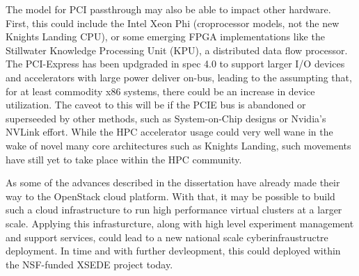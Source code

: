 The model for PCI passthrough may also be able to impact other hardware. First, this could include the Intel Xeon Phi (croprocessor models, not the new Knights Landing CPU), or some emerging FPGA implementations like the Stillwater Knowledge Processing Unit (KPU), a distributed data flow processor.  The PCI-Express has been updgraded in spec 4.0 to support larger I/O devices and accelerators with large power deliver on-bus, leading to the assumpting that, for at least commodity x86 systems, there could be an increase in device utilization. The caveot to this will be if the PCIE bus is abandoned or superseeded by other methods, such as System-on-Chip designs or Nvidia's NVLink effort.  While the HPC accelerator usage could very well wane in the wake of novel many core architectures such as Knights Landing, such movements have still yet to take place within the HPC community.  

As some of the advances described in the dissertation have already made their way to the OpenStack cloud platform. With that, it may be possible to build such a cloud infrastructure to run high performance virtual clusters at a larger scale. Applying this infrasturcture, along with high level experiment management and support services, could lead to a new national scale cyberinfraustructre deployment.  In time and with further devleopment, this could deployed within the NSF-funded XSEDE project today.  

